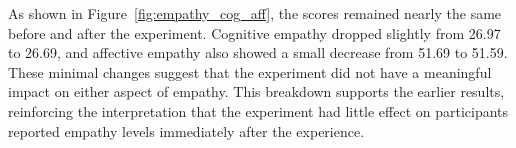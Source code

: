 \vspace{1em}

As shown in Figure~\ref{fig:empathy_cog_aff}, the scores remained nearly the same before and after the experiment. Cognitive empathy dropped slightly from 26.97 to 26.69, and affective empathy also showed a small decrease from 51.69 to 51.59. These minimal changes suggest that the experiment did not have a meaningful impact on either aspect of empathy. This breakdown supports the earlier results, reinforcing the interpretation that the experiment had little effect on participants reported empathy levels immediately after the experience.







